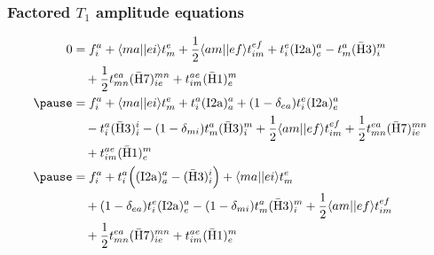 \begin{frame}
    \frametitle{Factored $T_1$ amplitude equations}

\begin{align*}
    0 &= f_{i}^a + \bra{ma}\ket{ei} t_m^e + \frac{1}{2} \bra{am}\ket{ef} t_{im}^{ef}
        + t_i^e (\mathrm{I2a})_e^a - t_m^a (\mathrm{\bar{H}3})_i^m \nn
    & \quad + \frac{1}{2} t_{mn}^{ea} (\mathrm{\bar{H}7})_{ie}^{mn} + t_{im}^{ae} 
        (\mathrm{\bar{H}1})_e^m \nn \pause
    &= f_{i}^a + \bra{ma}\ket{ei} t_m^e
        + t_i^a (\mathrm{I2a})_a^a + (1 - \delta_{ea}) t_i^e (\mathrm{I2a})_e^a \nn
    & \quad - t_i^a (\mathrm{\bar{H}3})_i^i - (1 - \delta_{mi}) t_m^a (\mathrm{\bar{H}3})_i^m 
        + \frac{1}{2} \bra{am}\ket{ef} t_{im}^{ef} + \frac{1}{2} t_{mn}^{ea} (\mathrm{\bar{H}7})_{ie}^{mn} \nn
    & \quad + t_{im}^{ae} (\mathrm{\bar{H}1})_e^m \nn \pause
    &= f_{i}^a + t_i^a \Bigl( (\mathrm{I2a})_a^a - (\mathrm{\bar{H}3})_i^i \Bigr)
        + \bra{ma}\ket{ei} t_m^e \nn
    & \quad + (1 - \delta_{ea}) t_i^e (\mathrm{I2a})_e^a - (1 - \delta_{mi}) t_m^a (\mathrm{\bar{H}3})_i^m
        + \frac{1}{2} \bra{am}\ket{ef} t_{im}^{ef} \nn
    & \quad + \frac{1}{2} t_{mn}^{ea} (\mathrm{\bar{H}7})_{ie}^{mn} + t_{im}^{ae} (\mathrm{\bar{H}1})_e^m \nn
\end{align*}
\end{frame}



